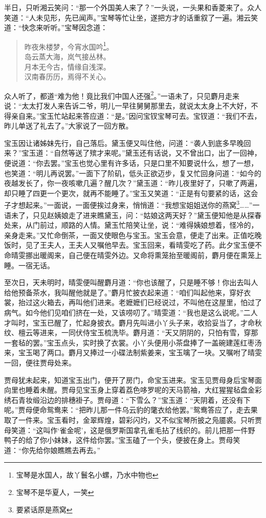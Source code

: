 \documentclass[12pt,oneside]{book}
\newenvironment{shici}{%
\begin{verse}%
\centering\large\hspace{12pt}}%
{\end{verse}}
\begin{document}
半日，只听湘云笑问：“那一个外国美人来了？”一头说，一头果和香菱来了。众人笑道：“人未见形，先已闻声。”宝琴等忙让坐，遂把方才的话重叙了一遍。湘云笑道：“快念来听听。”宝琴因念道：

\begin{shici}
昨夜朱楼梦，今宵水国吟\footnote{宝琴是水国人，故丫鬟名小螺，乃水中物也}。\\
岛云蒸大海，岚气接丛林。\\
月本无今古，情缘自浅深。\\
汉南春历历，焉得不关心。
\end{shici}


众人听了，都道“难为他！竟比我们中国人还强\footnote{宝琴不是华夏人，一笑}。”一语未了，只见麝月走来说：“太太打发人来告诉二爷，明儿一早往舅舅那里去，就说太太身上不大好，不得亲自来。”宝玉忙站起来答应道：“是。”因问宝钗宝琴可去。宝钗道：“我们不去，昨儿单送了礼去了。”大家说了一回方散。

宝玉因让诸姊妹先行，自己落后。黛玉便又叫住他，问道：“袭人到底多早晚回来？”宝玉道：“自然等送了殡才来呢。”黛玉还有话说，又不曾出口，出了一回神，便说道：“你去罢。”宝玉也觉心里有许多话，只是口里不知要说什么，想了一想，也笑道：“明儿再说罢。”一面下了阶矶，低头正欲迈步，复又忙回身问道：“如今的夜越发长了，你一夜咳嗽几遍？醒几次？”黛玉道：“昨儿夜里好了，只嗽了两遍，却只睡了四更一个更次，就再不能睡了。”宝玉又笑道：“正是有句要紧的话，这会子才想起来。”一面说，一面便挨过身来，悄悄道：“我想宝姐姐送你的燕窝\footnote{要紧话原是燕窝}……”一语未了，只见赵姨娘走了进来瞧黛玉，问：“姑娘这两天好？”黛玉便知他是从探春处来，从门前过，顺路的人情。黛玉忙陪笑让坐，说：“难得姨娘想着，怪冷的，亲身走来。”又忙命倒茶，一面又使眼色与宝玉。宝玉会意，便走了出来。正值吃晚饭时，见了王夫人，王夫人又嘱他早去。宝玉回来，看晴雯吃了药。此夕宝玉便不命晴雯挪出暖阁来，自己便在晴雯外边。又命将熏笼抬至暖阁前，麝月便在熏笼上睡。一宿无话。

至次日，天未明时，晴雯便叫醒麝月道：“你也该醒了，只是睡不够！你出去叫人给他预备茶水，我叫醒他就是了。”麝月忙披衣起来道：“咱们叫起他来，穿好衣裳，抬过这火箱去，再叫他们进来。老嬷嬷们已经说过，不叫他在这屋里，怕过了病气。如今他们见咱们挤在一处，又该唠叨了。”晴雯道：“我也是这么说呢。”二人才叫时，宝玉已醒了，忙起身披衣。麝月先叫进小丫头子来，收拾妥当了，才命秋纹、檀云等进来，一同伏侍宝玉梳洗毕。麝月道：“天又阴阴的，只怕有雪，穿那一套毡的罢。”宝玉点头，实时换了衣裳。小丫头便用小茶盘捧了一盖碗建莲红枣汤来，宝玉喝了两口。麝月又捧过一小碟法制紫姜来，宝玉噙了一块。又嘱咐了晴雯一回，便往贾母处来。

贾母犹未起来，知道宝玉出门，便开了房门，命宝玉进来。宝玉见贾母身后宝琴面向里也睡着未醒。贾母见宝玉身上穿着荔色哆罗呢的天马箭袖，大红猩猩毡盘金彩绣石青妆缎沿边的排穗褂子。贾母道：“下雪么？”宝玉道：“天阴着，还没有下呢。”贾母便命鸳鸯来：“把昨儿那一件乌云豹的氅衣给他罢。”鸳鸯答应了，走去果取了一件来。宝玉看时，金翠辉煌，碧彩闪灼，又不似宝琴所披之凫靥裘。只听贾母笑道：“这叫作‘雀金呢’，这是俄罗斯国拿孔雀毛拈了线织的。前儿把那一件野鸭子的给了你小妹妹，这件给你罢。”宝玉磕了一个头，便披在身上。贾母笑道：“你先给你娘瞧瞧去再去。”
\end{document}
